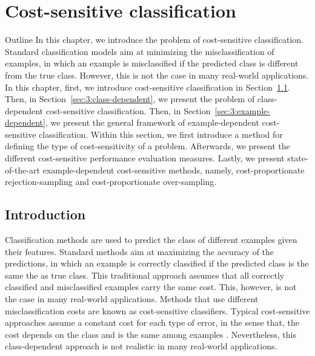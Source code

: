 \chapter{Cost-sensitive classification}\label{ch:3}

\begin{remark}{Outline}
In this chapter, we introduce the problem of cost-sensitive classification. Standard 
classification models aim at minimizing the misclassification of examples, in which an example is 
misclassified if the predicted class is different from the true class. However, this is not the 
case in many real-world applications.
In this chapter, first, we introduce cost-sensitive classification in Section~\ref{sec:3:intro}. 
Then, in Section~\ref{sec:3:class-dependent}, we present the problem of 
class-dependent cost-sensitive classification. Then, in Section~\ref{sec:3:example-dependent}, we 
present the general framework of example-dependent cost-sensitive classification. Within this 
section, we first introduce a method for defining the type of cost-sensitivity of a problem. 
Afterwards, we present the different cost-sensitive performance evaluation measures. Lastly, we 
present state-of-the-art example-dependent cost-sensitive methods, namely,  cost-proportionate 
rejection-sampling 
and cost-proportionate over-sampling.
\end{remark}


\section{Introduction}
\label{sec:3:intro}

  Classification methods are used to predict the class of different examples given their features.
  Standard methods aim at maximizing the accuracy of the predictions, in which an example is 
  correctly classified if the predicted class is the same the as true class. This traditional 
  approach assumes that all correctly classified and misclassified examples carry the same cost. 
  This, however, is not the case in   many real-world applications.   Methods that use different 
  misclassification costs are known as cost-sensitive  classifiers. Typical cost-sensitive 
  approaches assume a constant cost for each type of error, in  the sense that, the cost depends on 
  the class and is the same among examples \citep{Elkan2001,Kim2012}. Nevertheless, this 
  class-dependent approach is not realistic in many   real-world applications.
  
